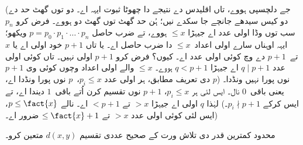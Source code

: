\documentclass[../../../include/open-logic-section]{subfiles}
\begin{document}
(جے دلچسپی ہووے، تاں اقلیدس دے نتیجے دا چھوٹا
ثبوت ایہہ اے۔ دو توں گھٹ حد دے دو کیس سیدھے
جانچے جا سکدے نیں؛ ہُن حد گھٹ توں گھٹ دو ہووے۔
فرض کرو $p_n$ سب توں وڈا اولی عدد اے جیہڑا
$\le x$ ہووے، تے ضرب حاصل $p =
p_0\cdot p_1 \cdot \dots \cdot p_n$ ویکھو؛ ایہہ
اوہناں سارے اولی اعداد~$\le x$ دا ضرب حاصل اے۔ یا تاں
$p+1$ خود اولی اے یا $x$ تے~$p+1$ دے وچ
کوئی اولی عدد اے۔ کیوں؟ فرض کرو $p+1$ اولی
نہیں۔ تاں کوئی اولی عدد $q \mid p+1$ اے جیہڑا
$q < p+1$ ہووے۔ $\le x$ والے اولی اعداد وچوں
کوئی وی $p+1$ نوں پورا نہیں ونڈدا۔ ($p$ دی تعریف
مطابق، ہر اولی عدد $p_i \le x$،~$p$ نوں پورا
ونڈدا اے، یعنی باقی~$0$ نال۔ ایس لئی ہر
$p_i \le x$، $p+1$ نوں تقسیم کرن اُتے باقی~$1$
دیندا اے، تے ایس کرکے $p_i \nmid p+1$۔) لہٰذا
$q$ اولی اے جیہڑا $> x$ تے $< p+1$ اے۔
نالے $p \le \fact{x}$، ایس لئی کوئی اولی عدد
$> x$ تے $\le
\fact{x}+1$ ضرور اے۔)

\begin{prob}
محدود کمترین قدر دی تلاش ورت کے صحیح عددی تقسیم
$d(x, y)$ متعین کرو۔
\end{prob}
\end{document}
